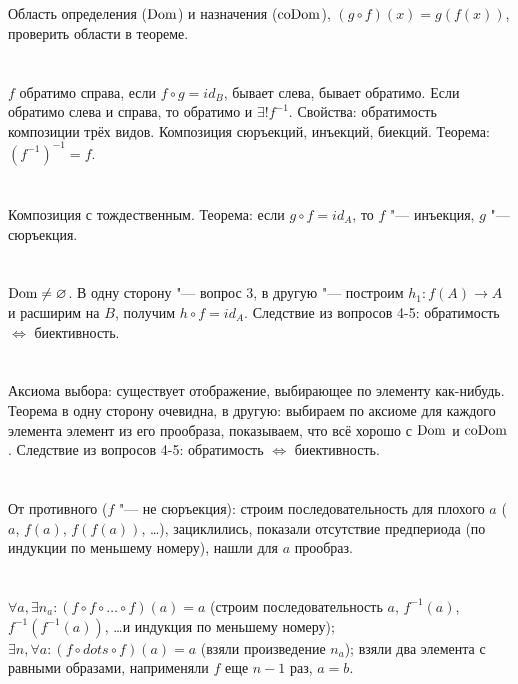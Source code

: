 \section{} %
Область определения ($\operatorname{Dom}$) и назначения ($\operatorname{coDom}$), $(g \circ f)(x)=g(f(x))$, проверить области в теореме.

\section{} %
$f$ обратимо справа, если $f \circ g = id_B$, бывает слева, бывает обратимо. Если обратимо слева и справа, то обратимо и $\exists! f^{-1}$.
Свойства: обратимость композиции трёх видов. Композиция сюръекций, инъекций, биекций. Теорема: $(f^{-1})^{-1} = f$.

\section{} %
Композиция с тождественным. Теорема: если $g \circ f = id_A$, то $f$ "--- инъекция, $g$ "--- сюръекция.

\section{} %
$\operatorname{Dom} \neq \varnothing$. В одну сторону "--- вопрос 3, в другую "--- построим $h_1 : f(A) \to A$ и расширим на $B$, получим $h \circ f = id_A$.
Следствие из вопросов 4-5: обратимость $\iff$ биективность.

\section{} %
Аксиома выбора: существует отображение, выбирающее по элементу как-нибудь. Теорема в одну сторону очевидна, в другую: выбираем
по аксиоме для каждого элемента элемент из его прообраза, показываем, что всё хорошо с $\operatorname{Dom}$ и $\operatorname{coDom}$.
Следствие из вопросов 4-5: обратимость $\iff$ биективность.

\section{} %
От противного ($f$ "--- не сюръекция): строим последовательность для плохого $a$ ($a$, $f(a)$, $f(f(a))$, \dots), зациклились, показали отсутствие предпериода (по индукции по меньшему номеру),
нашли для $a$ прообраз.

\section{} %
$\forall a, \exists n_a: (f\circ f\circ \dots \circ f)(a) = a$ (строим последовательность $a$, $f^{-1}(a)$, $f^{-1}(f^{-1}(a))$, \dots и индукция по меньшему номеру);
$\exists n, \forall a: (f \circ dots \circ f)(a) = a$ (взяли произведение $n_a$); взяли два элемента с равными образами, наприменяли $f$ еще $n-1$ раз, $a=b$.

